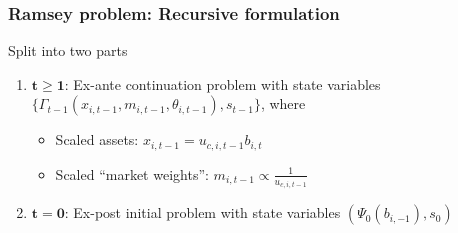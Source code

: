 \documentclass{beamer}
\begin{document}
\begin{frame}

\frametitle{Ramsey problem: Recursive formulation}

Split  into two parts

\begin{enumerate}
\vspace{3mm}
\item $\mathbf{t\geq1}$: Ex-ante continuation problem with state variables $\{\Gamma_{t-1}(x_{i,t-1},m_{i,t-1},\theta_{i,t-1}),s_{t-1}\}$, where

\begin{itemize}
 \item Scaled assets: $x_{i,t-1}=u_{c,i,t-1}b_{i,t}$
 \item Scaled ``market weights'': $m_{i,t-1}\propto \frac{1}{u_{c,i,t-1}}$
\end{itemize}

% 
\vspace{3mm}
\item $\mathbf{t=0} $: Ex-post initial problem with state variables $(\Psi_0(b_{i,-1}),s_{0})$
\end{enumerate}

\end{frame}
\end{document}
